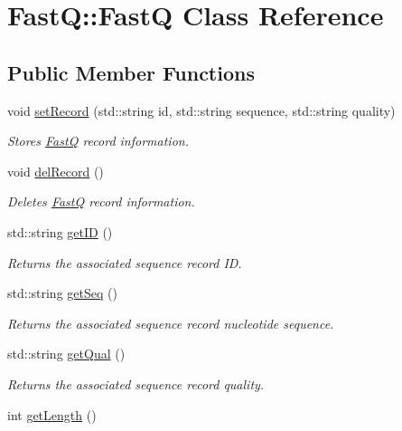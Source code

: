 \hypertarget{classFastQ_1_1FastQ}{}\section{FastQ\+:\+:FastQ Class Reference}
\label{classFastQ_1_1FastQ}
\subsection*{Public Member Functions}
\begin{DoxyCompactItemize}
\item 
void \hyperlink{classFastQ_1_1FastQ_a5337caac2157a69397ccddfeca1cacfa}{set\+Record} (std\+::string id, std\+::string sequence, std\+::string quality)
\begin{DoxyCompactList}\small\item\em Stores \hyperlink{classFastQ_1_1FastQ}{FastQ} record information. \end{DoxyCompactList}\item 
void \hyperlink{classFastQ_1_1FastQ_a4f50b92471fad28f422374ac89fc5472}{del\+Record} ()
\begin{DoxyCompactList}\small\item\em Deletes \hyperlink{classFastQ_1_1FastQ}{FastQ} record information. \end{DoxyCompactList}\item 
std\+::string \hyperlink{classFastQ_1_1FastQ_a643e987a7206140ae5ded7281290ef45}{get\+ID} ()
\begin{DoxyCompactList}\small\item\em Returns the associated sequence record ID. \end{DoxyCompactList}\item 
std\+::string \hyperlink{classFastQ_1_1FastQ_a4513b310634b575078452be266ebbc88}{get\+Seq} ()
\begin{DoxyCompactList}\small\item\em Returns the associated sequence record nucleotide sequence. \end{DoxyCompactList}\item 
std\+::string \hyperlink{classFastQ_1_1FastQ_a92dad9376fbdea44bdcac2d308b67c1a}{get\+Qual} ()
\begin{DoxyCompactList}\small\item\em Returns the associated sequence record quality. \end{DoxyCompactList}\item 
int \hyperlink{classFastQ_1_1FastQ_afecf19661436f27cc89db986b5e36906}{get\+Length} ()

\end{DoxyCompactItemize}
